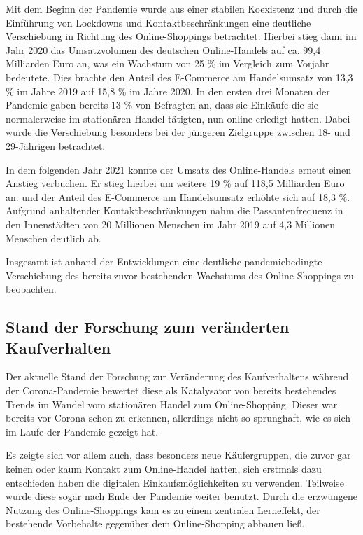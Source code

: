 Mit dem Beginn der Pandemie wurde aus einer stabilen Koexistenz und durch die Einführung von Lockdowns und Kontaktbeschränkungen eine deutliche Verschiebung in Richtung des Online-Shoppings betrachtet. Hierbei stieg dann im Jahr 2020 das Umsatzvolumen des deutschen Online-Handels auf ca. 99,4 Milliarden Euro an, was ein Wachstum von 25 \% im Vergleich zum Vorjahr bedeutete. Dies brachte den Anteil des E-Commerce am Handelsumsatz von 13,3 \% im Jahre 2019 auf 15,8 \% im Jahre 2020. In den ersten drei Monaten der Pandemie gaben bereits 13 \% von Befragten an, dass sie Einkäufe die sie normalerweise im stationären Handel tätigten, nun online erledigt hatten. Dabei wurde die Verschiebung besonders bei der jüngeren Zielgruppe zwischen 18- und 29-Jährigen betrachtet.

In dem folgenden Jahr 2021 konnte der Umsatz des Online-Handels erneut einen Anstieg verbuchen. Er stieg hierbei um weitere 19 \% auf 118,5 Milliarden Euro an. und der Anteil des E-Commerce am Handelsumsatz erhöhte sich auf 18,3 \%. Aufgrund anhaltender Kontaktbeschränkungen nahm die Passantenfrequenz in den Innenstädten von 20 Millionen Menschen im Jahr 2019 auf 4,3 Millionen Menschen deutlich ab.

Insgesamt ist anhand der Entwicklungen eine deutliche pandemiebedingte Verschiebung des bereits zuvor bestehenden Wachstums des Online-Shoppings zu beobachten.
\subsection{Stand der Forschung zum veränderten Kaufverhalten}
Der aktuelle Stand der Forschung zur Veränderung des Kaufverhaltens während der Corona-Pandemie bewertet diese als Katalysator von bereits bestehendes Trends im Wandel vom stationären Handel zum Online-Shopping. Dieser war bereits vor Corona schon zu erkennen, allerdings nicht so sprunghaft, wie es sich im Laufe der Pandemie gezeigt hat. 

Es zeigte sich vor allem auch, dass besonders neue Käufergruppen, die zuvor gar keinen oder kaum Kontakt zum Online-Handel hatten, sich erstmals dazu entschieden haben die digitalen Einkaufsmöglichkeiten zu verwenden. Teilweise wurde diese sogar nach Ende der Pandemie weiter benutzt.  Durch die erzwungene Nutzung des Online-Shoppings kam es zu einem zentralen Lerneffekt, der bestehende Vorbehalte gegenüber dem Online-Shopping abbauen ließ.

